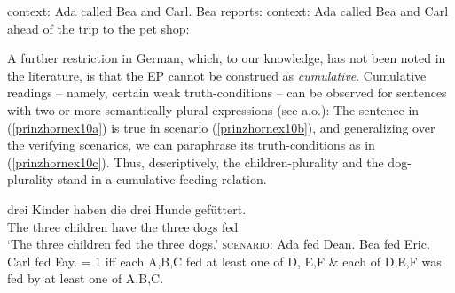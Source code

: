 \documentclass[output=paper,colorlinks,citecolor=brown,
]{langscibook}
\begin{document}
\ea \label{prinzhornex8} {\sc context: } Ada called Bea and Carl. Bea reports:
\z 
\ex \label{prinzhornex9} {\sc context: } Ada called Bea and Carl ahead of the trip to the pet shop:
\z \z

A further restriction in German, which, to our knowledge, has not been noted in the literature, is that the EP cannot be construed as {\it cumulative}. Cumulative readings -- namely, certain weak truth-conditions -- can be observed for sentences with two or more semantically plural expressions (see \citealt{Langendoen:1978} a.o.): The sentence in (\ref{prinzhornex10a}) is true in  scenario (\ref{prinzhornex10b}), and generalizing over the verifying scenarios, we can paraphrase its truth-conditions as in (\ref{prinzhornex10c}). Thus, descriptively, the children-plurality and the dog-plurality stand in a cumulative feeding-relation.

\ea \label{prinzhornmyex}
\ea {} {drei}  {Kinder} {haben} {die} {drei} {Hunde} {gefüttert}.\\
    The three children have the three dogs fed \\
\glt `The three children fed the three dogs.' \label{prinzhornex10a}
\ex   \textsc{scenario}: Ada fed Dean. Bea fed Eric. Carl fed Fay.  \label{prinzhornex10b}
\ex \sem{}{(\ref{prinzhornex10a})} = 1 iff each A,B,C fed at least one of  D, E,F $\&$ each of D,E,F was fed by at least one of A,B,C.\label{prinzhornex10c}
\z \z
\end{document}
